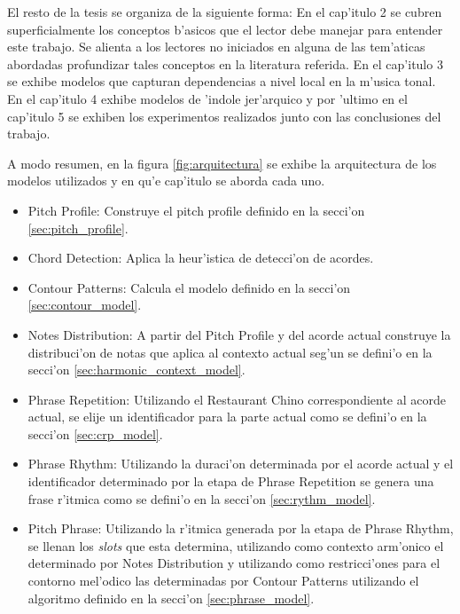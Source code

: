 El resto de la tesis se organiza de la siguiente forma: En el cap'itulo 2 se cubren superficialmente los conceptos b'asicos que el lector debe manejar para entender
este trabajo. Se alienta a los lectores no iniciados en alguna de las tem'aticas abordadas profundizar tales conceptos en la literatura referida. 
En el cap'itulo 3 se exhibe modelos que capturan dependencias a nivel local en la m'usica tonal. 
En el cap'itulo 4 exhibe modelos de 'indole jer'arquico y por 'ultimo en el cap'itulo 5 se exhiben los experimentos realizados junto con 
las conclusiones del trabajo.

A modo resumen, en la figura \ref{fig:arquitectura} se exhibe la arquitectura de los modelos utilizados y en qu'e cap'itulo se aborda cada uno.

\begin{imagen}
    \width{10.5cm}
\end{imagen}

\begin{itemize}
 \item Pitch Profile: Construye el pitch profile definido en la secci'on \ref{sec:pitch_profile}.
 \item Chord Detection: Aplica la heur'istica de detecci'on de acordes.
 \item Contour Patterns: Calcula el modelo definido en la secci'on \ref{sec:contour_model}.
 \item Notes Distribution: A partir del Pitch Profile y del acorde actual construye la distribuci'on de notas que aplica al contexto actual seg'un se defini'o en la secci'on \ref{sec:harmonic_context_model}.
 \item Phrase Repetition: Utilizando el Restaurant Chino correspondiente al acorde actual, se elije un identificador para la parte actual como 
 se defini'o en la secci'on \ref{sec:crp_model}.
 \item Phrase Rhythm: Utilizando la duraci'on determinada por el acorde actual y el identificador determinado por la etapa de Phrase Repetition se 
 genera una frase r'itmica como se defini'o en la secci'on \ref{sec:rythm_model}.
 \item Pitch Phrase: Utilizando la r'itmica generada por la etapa de Phrase Rhythm, se llenan los \emph{slots} que esta determina, utilizando
 como contexto arm'onico el determinado por Notes Distribution y utilizando como restricci'ones para el contorno mel'odico las determinadas por
 Contour Patterns utilizando el algoritmo definido en la secci'on \ref{sec:phrase_model}.
\end{itemize}


